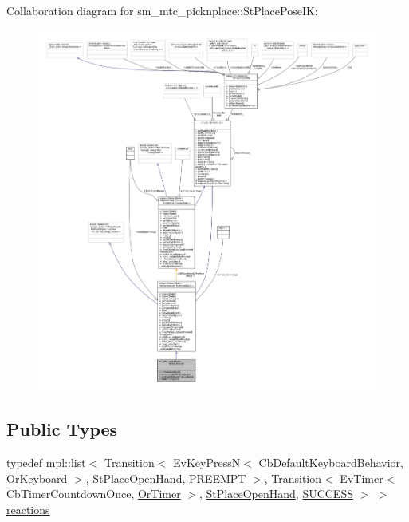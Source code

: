 Collaboration diagram for sm\+\_\+mtc\+\_\+picknplace\+:\+:St\+Place\+Pose\+IK\+:
\nopagebreak
\begin{figure}[H]
\begin{center}
\leavevmode
\includegraphics[width=350pt]{structsm__mtc__picknplace_1_1StPlacePoseIK__coll__graph}
\end{center}
\end{figure}
\subsection*{Public Types}
\begin{DoxyCompactItemize}
\item 
typedef mpl\+::list$<$ Transition$<$ Ev\+Key\+PressN$<$ Cb\+Default\+Keyboard\+Behavior, \hyperlink{classsm__mtc__picknplace_1_1OrKeyboard}{Or\+Keyboard} $>$, \hyperlink{structsm__mtc__picknplace_1_1StPlaceOpenHand}{St\+Place\+Open\+Hand}, \hyperlink{classPREEMPT}{P\+R\+E\+E\+M\+PT} $>$, Transition$<$ Ev\+Timer$<$ Cb\+Timer\+Countdown\+Once, \hyperlink{classsm__mtc__picknplace_1_1OrTimer}{Or\+Timer} $>$, \hyperlink{structsm__mtc__picknplace_1_1StPlaceOpenHand}{St\+Place\+Open\+Hand}, \hyperlink{classSUCCESS}{S\+U\+C\+C\+E\+SS} $>$ $>$ \hyperlink{structsm__mtc__picknplace_1_1StPlacePoseIK_a54f5ca0ff9e72a6de642c13a86d20813}{reactions}
\end{DoxyCompactItemize}
